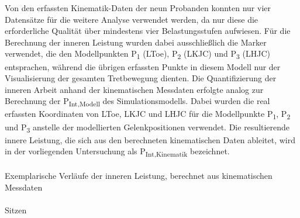 \documentclass[
  letterpaper,
  DIV=11]{scrartcl}
\makeatletter
\let\oldparagraph\paragraph
\renewcommand{\paragraph}{
    \@ifstar
      \xxxParagraphStar
      \xxxParagraphNoStar
  }
\newcommand{\xxxParagraphStar}[1]{\oldparagraph*{#1}\mbox{}}
\newcommand{\xxxParagraphNoStar}[1]{\oldparagraph{#1}\mbox{}}
\makeatother
\begin{document}
Von den erfassten Kinematik-Daten der neun Probanden konnten nur vier
Datensätze für die weitere Analyse verwendet werden, da nur diese die
erforderliche Qualität über mindestens vier Belastungsstufen aufwiesen.
Für die Berechnung der inneren Leistung wurden dabei ausschließlich die
Marker verwendet, die den Modellpunkten P\textsubscript{1} (LToe),
P\textsubscript{2} (LKJC) und P\textsubscript{3} (LHJC) entsprachen,
während die übrigen erfassten Punkte in diesem Modell nur der
Visualisierung der gesamten Tretbewegung dienten. Die Quantifizierung
der inneren Arbeit anhand der kinematischen Messdaten erfolgte analog
zur Berechnung der P\textsubscript{Int,Modell} des Simulationsmodells.
Dabei wurden die real erfassten Koordinaten von LToe, LKJC und LHJC für
die Modellpunkte P\textsubscript{1}, P\textsubscript{2} und
P\textsubscript{3} anstelle der modellierten Gelenkpositionen verwendet.
Die resultierende innere Leistung, die sich aus den berechneten
kinematischen Daten ableitet, wird in der vorliegenden Untersuchung als
P\textsubscript{Int,Kinematik} bezeichnet.

\paragraph{Exemplarische Verläufe der inneren Leistung, berechnet aus
kinematischen
Messdaten}\label{exemplarische-verluxe4ufe-der-inneren-leistung-berechnet-aus-kinematischen-messdaten}

\paragraph{Sitzen}
\end{document}

